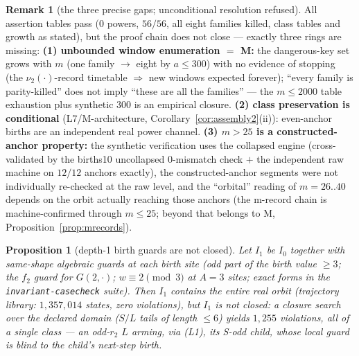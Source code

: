 \documentclass[11pt]{amsart}
\newtheorem{proposition}[theorem]{Proposition}
\theoremstyle{definition}
\newtheorem{remark}[theorem]{Remark}
\newcommand{\vtwo}[1]{\nu_2(#1)}
\begin{document}
\begin{remark}[the three precise gaps; unconditional resolution refused]\label{rem:gaps}
All assertion tables pass ($0$ powers, $56/56$, all eight families killed,
class tables and growth as stated), but the proof chain does not close ---
exactly three rings are missing:
\textbf{(1) unbounded window enumeration $=$ M:} the dangerous-key set grows
with $m$ (one family $\to$ eight by $a\le300$) with no evidence of stopping
(the $\vtwo{\cdot}$-record timetable $\Rightarrow$ new windows expected
forever); ``every family is parity-killed'' does not imply ``these are all
the families'' --- the $m\le2000$ table exhaustion plus synthetic $300$ is an
empirical closure.
\textbf{(2) class preservation is conditional} (L7/M-architecture,
Corollary~\ref{cor:assembly2}(ii)): even-anchor births are an independent
real power channel.
\textbf{(3) $m>25$ is a constructed-anchor property:} the synthetic
verification uses the collapsed engine (cross-validated by the births10
uncollapsed $0$-mismatch check $+$ the independent raw machine on $12/12$
anchors exactly), the constructed-anchor segments were not individually
re-checked at the raw level, and the ``orbital'' reading of $m=26..40$
depends on the orbit actually reaching those anchors (the m-record chain is
machine-confirmed through $m\le25$; beyond that belongs to M,
Proposition~\ref{prop:mrecords}).
\end{remark}

\begin{proposition}[depth-1 birth guards are not closed]\label{prop:depth1}
Let $I_1$ be $I_0$ together with same-shape algebraic guards at each birth
site (odd part of the birth value $\ge3$; the $f_2$ guard for $G(2,\cdot)$;
$w\equiv2\pmod3$ at $A=3$ sites; exact forms in the
\texttt{invariant-casecheck} suite). Then $I_1$ contains the entire real
orbit (trajectory library: $1{,}357{,}014$ states, zero violations), but
$I_1$ is \emph{not} closed: a closure search over the declared domain ($S/L$
tails of length $\le6$) yields $1{,}255$ violations, all of a single class
--- an odd-$r_2$ $L$ arming, via (L1), its S-odd child, whose local guard is
blind to the child's next-step birth.
\end{proposition}
\end{document}
